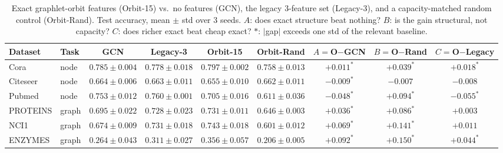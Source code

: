 \begin{table}[t]
  \centering
  \caption{Exact graphlet-orbit features (Orbit-15) vs.\ no features (GCN), the
  legacy 3-feature set (Legacy-3), and a capacity-matched random control
  (Orbit-Rand). Test accuracy, mean $\pm$ std over 3 seeds. $A$: does exact
  structure beat nothing? $B$: is the gain structural, not capacity? $C$: does
  richer exact beat cheap exact? \mbox{$*$}: $|$gap$|$ exceeds one std of the
  relevant baseline.}
  \label{tab:phase1b_orbit}
  \begin{tabular}{llccccccc}
    \toprule
    Dataset & Task & GCN & Legacy-3 & Orbit-15 & Orbit-Rand & $A{=}$O$-$GCN & $B{=}$O$-$Rand & $C{=}$O$-$Legacy \\
    \midrule
    Cora     & node  & $0.785 \pm 0.004$ & $0.778 \pm 0.018$ & $\mathbf{0.797 \pm 0.002}$ & $0.758 \pm 0.013$ & $+0.011^{*}$ & $+0.039^{*}$ & $+0.018^{*}$ \\
    Citeseer & node  & $0.664 \pm 0.006$ & $0.663 \pm 0.011$ & $0.655 \pm 0.010$ & $0.662 \pm 0.011$ & $-0.009^{*}$ & $-0.007$ & $-0.008$ \\
    Pubmed   & node  & $0.753 \pm 0.012$ & $0.760 \pm 0.001$ & $0.705 \pm 0.016$ & $0.611 \pm 0.036$ & $-0.048^{*}$ & $+0.094^{*}$ & $-0.055^{*}$ \\
    \midrule
    PROTEINS & graph & $0.695 \pm 0.022$ & $0.728 \pm 0.023$ & $\mathbf{0.731 \pm 0.011}$ & $0.646 \pm 0.003$ & $+0.036^{*}$ & $+0.086^{*}$ & $+0.003$ \\
    NCI1     & graph & $0.674 \pm 0.009$ & $0.731 \pm 0.018$ & $\mathbf{0.743 \pm 0.018}$ & $0.601 \pm 0.012$ & $+0.069^{*}$ & $+0.141^{*}$ & $+0.011$ \\
    ENZYMES  & graph & $0.264 \pm 0.043$ & $0.311 \pm 0.027$ & $\mathbf{0.356 \pm 0.057}$ & $0.206 \pm 0.005$ & $+0.092^{*}$ & $+0.150^{*}$ & $+0.044^{*}$ \\
    \bottomrule
  \end{tabular}
\end{table}

